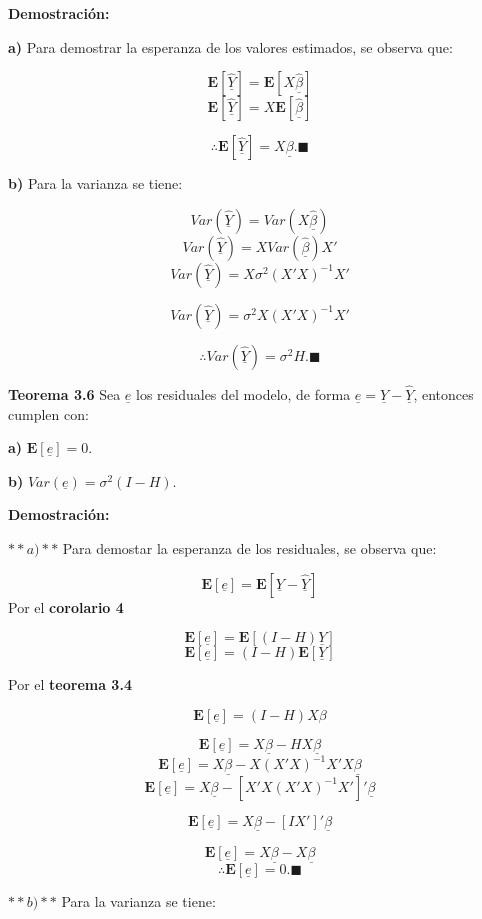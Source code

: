 \documentclass[
  a4paper,
  oneside,
  openany]{book}
\begin{document}
\textbf{Demostración:}

\textbf{a)} Para demostrar la esperanza de los valores estimados, se observa que:

\[\mathbf{E}[\underline{\hat{Y}}]=\mathbf{E}[X\underline{\hat{\beta}}]\]
\[\mathbf{E}[\underline{\hat{Y}}]=X\mathbf{E}[\underline{\hat{\beta}}]\]

\[\therefore \mathbf{E}[\underline{\hat{Y}}]=X\underline{\beta}. \blacksquare\]

\textbf{b)} Para la varianza se tiene:

\[Var(\underline{\hat{Y}})=Var(X\underline{\hat{\beta}})\]
\[Var(\underline{\hat{Y}})=XVar(\underline{\hat{\beta}})X'\]
\[Var(\underline{\hat{Y}})=X\sigma^2(X'X)^{-1}X'\]

\[Var(\underline{\hat{Y}})=\sigma^2X(X'X)^{-1}X'\]

\[\therefore Var(\underline{\hat{Y}})=\sigma^2H.\blacksquare\]

\textbf{Teorema 3.6} Sea \(\underline{e}\) los residuales del modelo, de forma \(\underline{e}=\underline{Y}-\underline{\hat{Y}}\), entonces cumplen con:

\textbf{a)} \(\mathbf{E}[\underline{e}]=0.\)

\textbf{b)} \(Var(\underline{e})=\sigma^2(I-H).\)

\textbf{Demostración:}

\(**a)**\) Para demostar la esperanza de los residuales, se observa que:

\[\mathbf{E}[\underline{e}]=\mathbf{E}[\underline{Y}-\underline{\hat{Y}}]\]
Por el \textbf{corolario 4}

\[\mathbf{E}[\underline{e}]=\mathbf{E}[(I-H)\underline{Y}]\]
\[\mathbf{E}[\underline{e}]=(I-H)\mathbf{E}[\underline{Y}]\]

Por el \textbf{teorema 3.4}

\[\mathbf{E}[\underline{e}]=(I-H)X\beta\]

\[\mathbf{E}[\underline{e}]=X\underline{\beta}-HX\underline{\beta}\]
\[\mathbf{E}[\underline{e}]=X\underline{\beta}-X(X'X)^{-1}X'X\underline{\beta}\]
\[\mathbf{E}[\underline{e}]=X\underline{\beta}-\left[X'X(X'X)^{-1}X'\right]'\underline{\beta}\]

\[\mathbf{E}[\underline{e}]=X\underline{\beta}-[IX']'\underline{\beta}\]

\[\mathbf{E}[\underline{e}]=X\underline{\beta}-X\underline{\beta}\]
\[\therefore \mathbf{E}[\underline{e}]=0. \blacksquare\]

\(**b)**\) Para la varianza se tiene:
\end{document}
